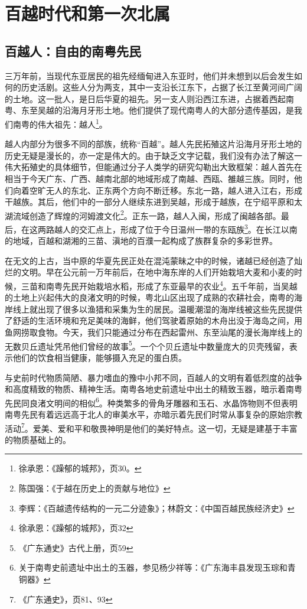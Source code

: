 \chapter{百越时代和第一次北属}

\section{百越人：自由的南粤先民}

\indent 三万年前，当现代东亚居民的祖先经缅甸进入东亚时，他们并未想到以后会发生如何的历史活剧。这些人分为两支，其中一支沿长江东下，占据了长江至黄河间广阔的土地。这一批人，是日后华夏的祖先。另一支人则沿西江东进，占据着西起南粤、东至吴越的沿海月牙形土地。他们提供了现代南粤人的大部分遗传基因，是我们南粤的伟大祖先：越人\footnote{徐承恩：《躁郁的城邦》，页30。}。

越人内部分为很多不同的部族，统称“百越”。越人先民拓殖这片沿海月牙形土地的历史无疑是漫长的，亦一定是伟大的。由于缺乏文字记载，我们没有办法了解这一伟大拓殖史的具体细节，但能通过分子人类学的研究勾勒出大致框架：越人首先在相当于今天广东、广西、越南北部的地域形成了南越、西瓯、雒越三族。同时，他们向着空旷无人的东北、正东两个方向不断迁移。东北一路，越人进入江右，形成干越族。其后，他们中的一部分人继续东进到吴越，形成于越族，在宁绍平原和太湖流域创造了辉煌的河姆渡文化\footnote{陈国强：《于越在历史上的贡献与地位》}。正东一路，越人入闽，形成了闽越各部。最后，在这两路越人的交汇点上，形成了位于今日温州一带的东瓯族\footnote{李辉：《百越遗传结构的一元二分迹象》；林蔚文：《中国百越民族经济史》}。在长江以南的地域，百越和湖湘的三苗、滇地的百濮一起构成了族群复杂的多彩世界。

在无文的上古，当中原的华夏先民正处在混沌蒙昧之中的时候，诸越已经创造了灿烂的文明。早在公元前一万年前后，在地中海东岸的人们开始栽培大麦和小麦的时候，三苗和南粤先民开始栽培水稻，形成了东亚最早的农业\footnote{徐承恩：《躁郁的城邦》，页32}。五千年前，当吴越的土地上兴起伟大的良渚文明的时候，粤北山区出现了成熟的农耕社会，南粤的海岸线上就出现了很多以渔猎和采集为生的居民。温暖潮湿的海岸线被这些先民提供了舒适的生活环境和充足美味的海鲜，他们驾驶着原始的木舟出没于海岛之间，用鱼网捞取食物。今天，我们只能通过分布在西起雷州、东至汕尾的漫长海岸线上的无数贝丘遗址凭吊他们曾经的故事\footnote{《广东通史》古代上册，页59}。一个个贝丘遗址中数量庞大的贝壳残留，表示他们的饮食相当健康，能够摄入充足的蛋白质。

与史前时代物质简陋、暴力嗜血的豫中小邦不同，百越人的文明有着低烈度的战争和高度精致的物质、精神生活。南粤各地史前遗址中出土的精致玉器，暗示着南粤先民同良渚文明间的相似\footnote{关于南粤史前遗址中出土的玉器，参见杨少祥等：《广东海丰县发现玉琮和青铜器》}。种类繁多的骨角牙雕器和玉石、水晶饰物则不但表明南粤先民有着远远高于北人的审美水平，亦暗示着先民们时常从事复杂的原始宗教活动\footnote{《广东通史》，页81、93}。爱美、爱和平和敬畏神明是他们的美好特点。这一切，无疑是建基于丰富的物质基础上的。

